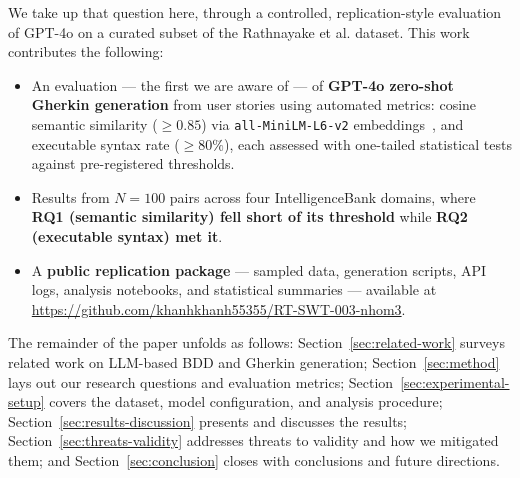 We take up that question here, through a controlled, replication-style evaluation of GPT-4o on a curated subset of the Rathnayake et al. dataset.
This work contributes the following:
\begin{itemize}
  \item An evaluation --- the first we are aware of --- of \textbf{GPT-4o zero-shot Gherkin generation} from user stories using automated metrics: cosine semantic similarity ($\geq 0.85$) via \texttt{all-MiniLM-L6-v2} embeddings~\cite{reimers2019sentence}, and executable syntax rate ($\geq 80\%$), each assessed with one-tailed statistical tests against pre-registered thresholds.
  \item Results from $N{=}100$ pairs across four IntelligenceBank domains, where \textbf{RQ1 (semantic similarity) fell short of its threshold} while \textbf{RQ2 (executable syntax) met it}.
  \item A \textbf{public replication package} --- sampled data, generation scripts, API logs, analysis notebooks, and statistical summaries --- available at \url{https://github.com/khanhkhanh55355/RT-SWT-003-nhom3}.
\end{itemize}

The remainder of the paper unfolds as follows: Section~\ref{sec:related-work} surveys related work on LLM-based BDD and Gherkin generation; Section~\ref{sec:method} lays out our research questions and evaluation metrics; Section~\ref{sec:experimental-setup} covers the dataset, model configuration, and analysis procedure; Section~\ref{sec:results-discussion} presents and discusses the results; Section~\ref{sec:threats-validity} addresses threats to validity and how we mitigated them; and Section~\ref{sec:conclusion} closes with conclusions and future directions.

